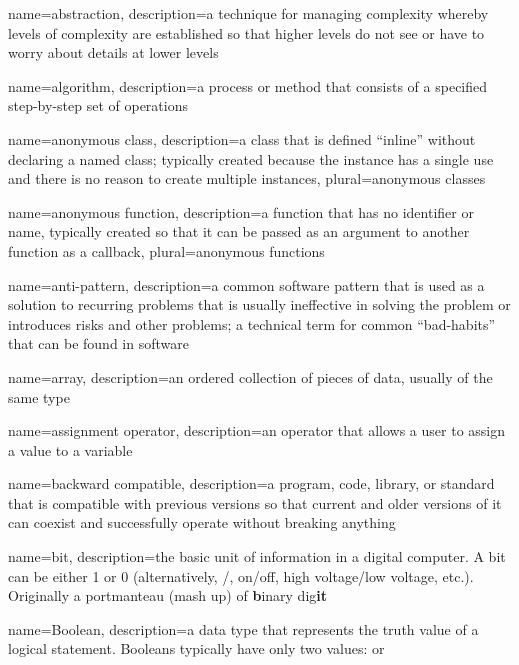 
{
  name=abstraction,
  description={a technique for managing complexity whereby levels of complexity are established so that higher levels do not see or have to worry about details at lower levels}
}

{
  name=algorithm,
  description={a process or method that consists of a specified step-by-step set of operations}
}

{
  name=anonymous class,
  description={a class that is defined ``inline'' without declaring a named class; typically created because the instance has a single use and there is no reason to create multiple instances},
  plural=anonymous classes
}

{
  name=anonymous function,
  description={a function that has no identifier or name, typically created so that it can be passed as an argument to another function as a callback},
  plural=anonymous functions
}

{
  name=anti-pattern,
  description={a common software pattern that is used as a solution to recurring problems that is usually ineffective in solving the problem or introduces risks and other problems; a technical term for common ``bad-habits'' that can be found in software}
}

{
  name=array,
  description={an ordered collection of pieces of data, usually of the same type}
}

{
  name=assignment operator,
  description={an operator that allows a user to assign a value to a variable}
}

{
  name=backward compatible,
  description={a program, code, library, or standard that is compatible with previous versions so that current
  	and older versions of it can coexist and successfully operate without breaking anything}
}

{
  name=bit,
  description={the basic unit of information in a digital computer.  A bit can be either 1 or 0 (alternatively, \True/\False, 
  	on/off, high voltage/low voltage, etc.).  Originally a portmanteau (mash up) of \textbf{b}inary dig\textbf{it}}
}

{
  name=Boolean,
  description={a data type that represents the truth value of a logical statement.  Booleans typically have only two 
  	values: \True or \False}
}

